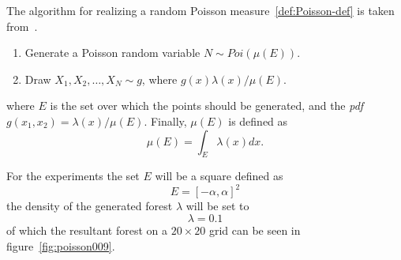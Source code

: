 The algorithm for realizing a random Poisson measure~\cref{def:Poisson-def} is
taken from~\cite[Definition 1.1.1,p~34]{Kroese_2014}.

\begin{definition}
  \label{def:Poisson-def}
  \begin{enumerate}
  \item Generate a Poisson random variable \(N \sim Poi(\mu(E))\).
  \item Draw \(X_1,X_2,\ldots,X_N \sim g\), where \(g(x) \lambda(x)/ \mu(E)\).
  \end{enumerate}
\end{definition}
where \(E\) is the set over which the points should be generated, and the
\textit{pdf} \(g(x_1, x_2) = \lambda(x)/\mu(E)\). Finally, \(\mu(E)\) is defined
as
\[
  \mu(E) = \int_{E} \lambda(x) dx.
\]

For the experiments the set \(E\) will be a square defined as
\[
  E = {[-\alpha, \alpha]}^2
\]
the density of the generated forest \(\lambda\) will be set to
\[
  \lambda = 0.1
\]
of which the resultant forest on a \(20 \times 20\) grid can be seen in
figure~\cref{fig:poisson009}.

